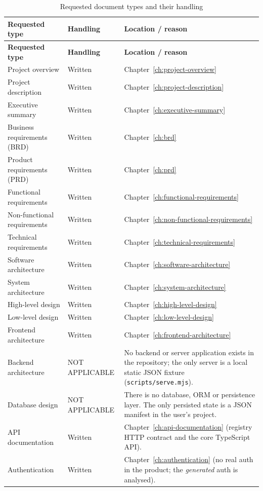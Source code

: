\begin{longtable}{@{}L{4.6cm}L{2.7cm}L{7.1cm}@{}}
\caption{Requested document types and their handling}\\
\toprule
\textbf{Requested type} & \textbf{Handling} & \textbf{Location / reason} \\
\midrule
\endfirsthead
\toprule
\textbf{Requested type} & \textbf{Handling} & \textbf{Location / reason} \\
\midrule
\endhead
Project overview & Written & Chapter~\ref{ch:project-overview} \\
Project description & Written & Chapter~\ref{ch:project-description} \\
Executive summary & Written & Chapter~\ref{ch:executive-summary} \\
Business requirements (BRD) & Written & Chapter~\ref{ch:brd} \\
Product requirements (PRD) & Written & Chapter~\ref{ch:prd} \\
Functional requirements & Written & Chapter~\ref{ch:functional-requirements} \\
Non-functional requirements & Written & Chapter~\ref{ch:non-functional-requirements} \\
Technical requirements & Written & Chapter~\ref{ch:technical-requirements} \\
Software architecture & Written & Chapter~\ref{ch:software-architecture} \\
System architecture & Written & Chapter~\ref{ch:system-architecture} \\
High-level design & Written & Chapter~\ref{ch:high-level-design} \\
Low-level design & Written & Chapter~\ref{ch:low-level-design} \\
Frontend architecture & Written & Chapter~\ref{ch:frontend-architecture} \\
Backend architecture & NOT APPLICABLE & No backend or server application exists
in the repository; the only server is a local static JSON fixture
(\texttt{scripts/serve.mjs}). \\
Database design & NOT APPLICABLE & There is no database, ORM or persistence layer.
The only persisted state is a JSON manifest in the user's project. \\
API documentation & Written & Chapter~\ref{ch:api-documentation} (registry HTTP
contract and the core TypeScript API). \\
Authentication & Written & Chapter~\ref{ch:authentication} (no real auth in the
product; the \emph{generated} auth is analysed). \\

\end{longtable}
